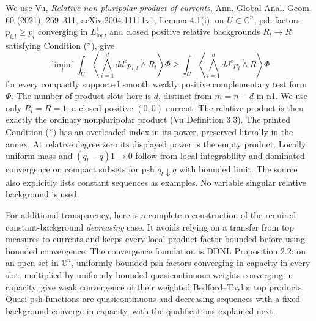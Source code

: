 \documentclass[
  11pt,
]{article}
\begin{document}
We use Vu, \emph{Relative non-pluripolar product of currents}, Ann.
Global Anal. Geom. 60 (2021), 269--311, arXiv:2004.11111v1, Lemma
4.1(i): on \(U\subset\mathbb{C}^n\), psh factors \(p_{i,l}\geq p_i\)
converging in \(L^1_{\mathrm{loc}}\), and closed positive relative
backgrounds \(R_l\to R\) satisfying Condition (*), give \[
\liminf_l\int_U\left\langle\bigwedge_{i=1}^d dd^cp_{i,l}\mathbin{\dot\wedge}R_l\right\rangle\Phi
\geq\int_U\left\langle\bigwedge_{i=1}^d dd^cp_i\mathbin{\dot\wedge}R\right\rangle\Phi
\] for every compactly supported smooth weakly positive complementary
test form \(\Phi\). The number of product slots here is \(d\), distinct
from \(m=n-d\) in n1. We use only \(R_l=R=1\), a closed positive
\((0,0)\) current. The relative product is then exactly the ordinary
nonpluripolar product (Vu Definition 3.3). The printed Condition (*) has
an overloaded index in its power, preserved literally in the annex. At
relative degree zero its displayed power is the empty product. Locally
uniform mass and \((q_l-q)1\to0\) follow from local integrability and
dominated convergence on compact subsets for psh \(q_l\downarrow q\)
with bounded limit. The source also explicitly lists constant sequences
as examples. No variable singular relative background is used.

For additional transparency, here is a complete reconstruction of the
required constant-background \emph{decreasing} case. It avoids relying
on a transfer from top measures to currents and keeps every local
product factor bounded before using bounded convergence. The convergence
foundation is DDNL Proposition 2.2: on an open set in \(\mathbb{C}^n\),
uniformly bounded psh factors converging in capacity in every slot,
multiplied by uniformly bounded quasicontinuous weights converging in
capacity, give weak convergence of their weighted Bedford--Taylor top
products. Quasi-psh functions are quasicontinuous and decreasing
sequences with a fixed background converge in capacity, with the
qualifications explained next.
\end{document}
